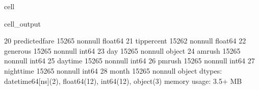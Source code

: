 \documentclass[letterpaper,10pt,english]{sphinxmanual}
\begin{document}
\begin{sphinxuseclass}{cell}
\begin{sphinxuseclass}{cell_output}
\begin{sphinxVerbatim}[commandchars=\\\{\}]
 20  predicted\PYGZus{}fare         15265 non\PYGZhy{}null  float64       
 21  tip\PYGZus{}percent            15262 non\PYGZhy{}null  float64       
 22  generous               15265 non\PYGZhy{}null  int64         
 23  day                    15265 non\PYGZhy{}null  object        
 24  am\PYGZus{}rush                15265 non\PYGZhy{}null  int64         
 25  daytime                15265 non\PYGZhy{}null  int64         
 26  pm\PYGZus{}rush                15265 non\PYGZhy{}null  int64         
 27  nighttime              15265 non\PYGZhy{}null  int64         
 28  month                  15265 non\PYGZhy{}null  object        
dtypes: datetime64[ns](2), float64(12), int64(12), object(3)
memory usage: 3.5+ MB
\end{sphinxVerbatim}

\end{sphinxuseclass}
\end{sphinxuseclass}
\end{document}
